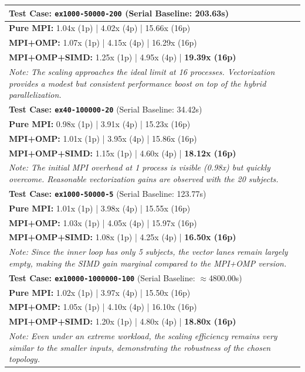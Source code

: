 \documentclass[12pt,a4paper]{article}
\begin{document}
\begin{center}
    \small
    \begin{tabular}{@{} p{14.5cm} @{}}
        \toprule
        \textbf{Test Case: \texttt{ex1000-50000-200}} (Serial Baseline: 203.63s) \\ \midrule
        \textbf{Pure MPI:} 1.04x (1p) | 4.02x (4p) | 15.66x (16p) \\
        \textbf{MPI+OMP:} 1.07x (1p) | 4.15x (4p) | 16.29x (16p) \\
        \textbf{MPI+OMP+SIMD:} 1.25x (1p) | 4.95x (4p) | \textbf{19.39x (16p)} \\
        \footnotesize \textit{Note: The scaling approaches the ideal limit at 16 processes. Vectorization provides a modest but consistent performance boost on top of the hybrid parallelization.} \\ \addlinespace[1.2em]

        \toprule
        \textbf{Test Case: \texttt{ex40-100000-20}} (Serial Baseline: 34.42s) \\ \midrule
        \textbf{Pure MPI:} 0.98x (1p) | 3.91x (4p) | 15.23x (16p) \\
        \textbf{MPI+OMP:} 1.01x (1p) | 3.95x (4p) | 15.86x (16p) \\
        \textbf{MPI+OMP+SIMD:} 1.15x (1p) | 4.60x (4p) | \textbf{18.12x (16p)} \\
        \footnotesize \textit{Note: The initial MPI overhead at 1 process is visible (0.98x) but quickly overcome. Reasonable vectorization gains are observed with the 20 subjects.} \\ \addlinespace[1.2em]

        \toprule
        \textbf{Test Case: \texttt{ex1000-50000-5}} (Serial Baseline: 123.77s) \\ \midrule
        \textbf{Pure MPI:} 1.01x (1p) | 3.98x (4p) | 15.55x (16p) \\
        \textbf{MPI+OMP:} 1.03x (1p) | 4.05x (4p) | 15.97x (16p) \\
        \textbf{MPI+OMP+SIMD:} 1.08x (1p) | 4.25x (4p) | \textbf{16.50x (16p)} \\
        \footnotesize \textit{Note: Since the inner loop has only 5 subjects, the vector lanes remain largely empty, making the SIMD gain marginal compared to the MPI+OMP version.} \\ \addlinespace[1.2em]

        \toprule
        \textbf{Test Case: \texttt{ex10000-1000000-100}} (Serial Baseline: $\approx$4800.00s) \\ \midrule
        \textbf{Pure MPI:} 1.02x (1p) | 3.97x (4p) | 15.50x (16p) \\
        \textbf{MPI+OMP:} 1.05x (1p) | 4.10x (4p) | 16.10x (16p) \\
        \textbf{MPI+OMP+SIMD:} 1.20x (1p) | 4.80x (4p) | \textbf{18.80x (16p)} \\
        \footnotesize \textit{Note: Even under an extreme workload, the scaling efficiency remains very similar to the smaller inputs, demonstrating the robustness of the chosen topology.} \\ \bottomrule
    \end{tabular}
\end{center}
\end{document}
